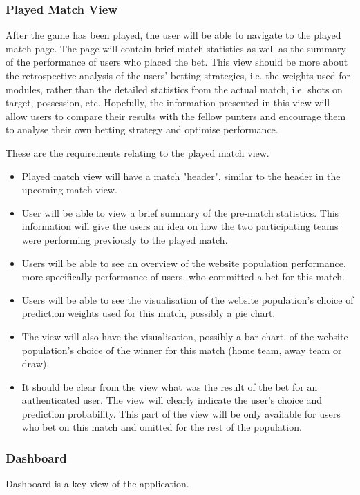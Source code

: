 \subsubsection{Played Match View}
\label{subsubsec:playedmatch_req}
After the game has been played, the user will be able to navigate to the played match page. The page will contain brief match statistics as well as the summary of the performance of users who placed the bet. This view should be more about the retrospective analysis of the users' betting strategies, i.e. the weights used for modules, rather than the detailed statistics from the actual match, i.e. shots on target, possession, etc. Hopefully, the information presented in this view will allow users to compare their results with the fellow punters and encourage them to analyse their own betting strategy and optimise performance.

These are the requirements relating to the played match view.

\begin{itemize}
	\item Played match view will have a match "header", similar to the header in the upcoming match view.
	\item User will be able to view a brief summary of the pre-match statistics. This information will give the users an idea on how the two participating teams were performing previously to the played match.
	\item Users will be able to see an overview of the website population performance, more specifically performance of users, who committed a bet for this match.
	\item Users will be able to see the visualisation of the website population's choice of prediction weights used for this match, possibly a pie chart.
	\item The view will also have the visualisation, possibly a bar chart, of the website population's choice of the winner for this match (home team, away team or draw).
	\item It should be clear from the view what was the result of the bet for an authenticated user. The view will clearly indicate the user's choice and prediction probability. This part of the view will be only available for users who bet on this match and omitted for the rest of the population.
\end{itemize}

\subsubsection{Dashboard}
\label{subsubsec:dashboard_req}
Dashboard is a key view of the application.

